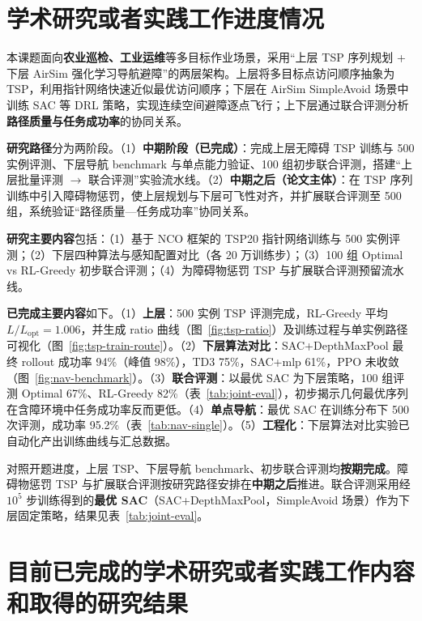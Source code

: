 
\section{学术研究或者实践工作进度情况}

本课题面向\textbf{农业巡检、工业运维}等多目标作业场景，采用``上层 TSP 序列规划 + 下层 AirSim 强化学习导航避障''的两层架构。上层将多目标点访问顺序抽象为 TSP，利用指针网络快速近似最优访问顺序；下层在 AirSim SimpleAvoid 场景中训练 SAC 等 DRL 策略，实现连续空间避障逐点飞行；上下层通过联合评测分析\textbf{路径质量与任务成功率}的协同关系。

\textbf{研究路径}分为两阶段。（1）\textbf{中期阶段（已完成）}：完成上层无障碍 TSP 训练与 500 实例评测、下层导航 benchmark 与单点能力验证、100 组初步联合评测，搭建``上层批量评测 $\to$ 联合评测''实验流水线。（2）\textbf{中期之后（论文主体）}：在 TSP 序列训练中引入障碍物惩罚，使上层规划与下层可飞性对齐，并扩展联合评测至 500 组，系统验证``路径质量—任务成功率''协同关系。

\textbf{研究主要内容}包括：（1）基于 NCO 框架的 TSP20 指针网络训练与 500 实例评测；（2）下层四种算法与感知配置对比（各 20 万训练步）；（3）100 组 Optimal vs RL-Greedy 初步联合评测；（4）为障碍物惩罚 TSP 与扩展联合评测预留流水线。

\textbf{已完成主要内容}如下。（1）\textbf{上层}：500 实例 TSP 评测完成，RL-Greedy 平均 $L/L_{\mathrm{opt}}=1.006$，并生成 ratio 曲线（图~\ref{fig:tsp-ratio}）及训练过程与单实例路径可视化（图~\ref{fig:tsp-train-route}）。（2）\textbf{下层算法对比}：SAC+DepthMaxPool 最终 rollout 成功率 94\%（峰值 98\%），TD3 75\%，SAC+mlp 61\%，PPO 未收敛（图~\ref{fig:nav-benchmark}）。（3）\textbf{联合评测}：以最优 SAC 为下层策略，100 组评测 Optimal 67\%、RL-Greedy 82\%（表~\ref{tab:joint-eval}），初步揭示几何最优序列在含障环境中任务成功率反而更低。（4）\textbf{单点导航}：最优 SAC 在训练分布下 500 次评测，成功率 95.2\%（表~\ref{tab:nav-single}）。（5）\textbf{工程化}：下层算法对比实验已自动化产出训练曲线与汇总数据。

对照开题进度，上层 TSP、下层导航 benchmark、初步联合评测均\textbf{按期完成}。障碍物惩罚 TSP 与扩展联合评测按研究路径安排在\textbf{中期之后}推进。联合评测采用经 $10^5$ 步训练得到的\textbf{最优 SAC}（SAC+DepthMaxPool，SimpleAvoid 场景）作为下层固定策略，结果见表~\ref{tab:joint-eval}。

\section{目前已完成的学术研究或者实践工作内容和取得的研究结果}

